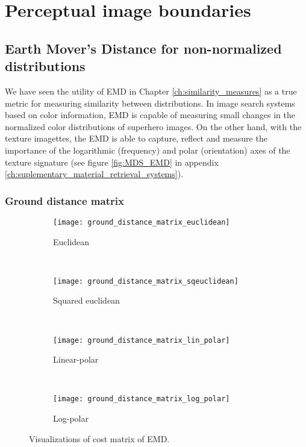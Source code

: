 \section{Perceptual image boundaries}


\subsection{Earth Mover's Distance for non-normalized distributions}
We have seen the utility of EMD in Chapter \ref{ch:similarity_measures} as a true metric for measuring similarity between distributions. In image search systems based on color information, EMD is capable of measuring small changes in the normalized color distributions of superhero images. On the other hand, with the texture imagettes, the EMD is able to capture, reflect and measure the importance of the logarithmic (frequency) and polar (orientation) axes of the texture signature (see figure \ref{fig:MDS_EMD}  in appendix \ref{ch:suplementary_material_retrieval_systems}). 


\subsubsection{Ground distance matrix}


\begin{figure}[!ht]
    \centering
    \begin{subfigure}[b]{0.47\textwidth}
		\texttt{[image: ground\_distance\_matrix\_euclidean]}	
		\caption{Euclidean}
        \label{fig:ground_distance_matrix_euclidean}
	\end{subfigure}
	~ %
    \begin{subfigure}[b]{0.47\textwidth}
		\texttt{[image: ground\_distance\_matrix\_sqeuclidean]}	
		\caption{Squared euclidean}
        \label{fig:ground_distance_matrix_sqeuclidean}
	\end{subfigure} \\[2ex]
    
    \begin{subfigure}[b]{0.47\textwidth}
		\texttt{[image: ground\_distance\_matrix\_lin\_polar]}	
		\caption{Linear-polar}
        \label{fig:ground_distance_matrix_lin_polarc}
	\end{subfigure}  
	~ %
	\begin{subfigure}[b]{0.47\textwidth}
		\texttt{[image: ground\_distance\_matrix\_log\_polar]}	
		\caption{Log-polar}
        \label{fig:ground_distance_matrix_log_polar}
	\end{subfigure}  
	   
   \caption{Visualizations of cost matrix of EMD.}
   \label{fig:EMD_ground_distance_matrix}
\end{figure}

